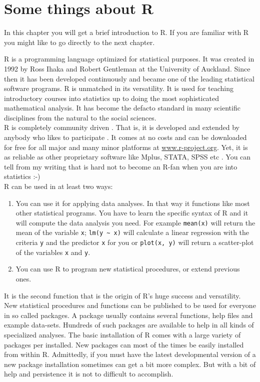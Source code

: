 \documentclass[
  letterpaper,
  DIV=11,
  numbers=noendperiod]{scrreprt}
\providecommand{\tightlist}{%
  \setlength{\itemsep}{0pt}\setlength{\parskip}{0pt}}\usepackage{longtable,booktabs,array}
\begin{document}
\hypertarget{some-things-about-r}{%
\chapter{Some things about R}\label{some-things-about-r}}

In this chapter you will get a brief introduction to R. If you are
familiar with R you might like to go directly to the next chapter.

\hfill\break
R is a programming language optimized for statistical purposes. It was
created in 1992 by Ross Ihaka and Robert Gentleman at the University of
Auckland. Since then it has been developed continuously and became one
of the leading statistical software programs. R is unmatched in its
versatility. It is used for teaching introductory courses into
statistics up to doing the most sophisticated mathematical analysis. It
has become the defacto standard in many scientific disciplines from the
natural to the social sciences.\\
R is completely community driven . That is, it is developed and extended
by anybody who likes to participate . It comes at no costs and can be
downloaded for free for all major and many minor platforms at
\href{http://www.r-project.org}{www.r-project.org}. Yet, it is as
reliable as other proprietary software like Mplus, STATA, SPSS etc . You
can tell from my writing that is hard not to become an R-fan when you
are into statistics :-)\\
R can be used in at least two ways:

\begin{enumerate}
\def\labelenumi{\arabic{enumi}.}
\tightlist
\item
  You can use it for applying data analyses. In that way it functions
  like most other statistical programs. You have to learn the specific
  syntax of R and it will compute the data analysis you need. For
  example \texttt{mean(x)} will return the mean of the variable
  \texttt{x}; \texttt{lm(y\ \textasciitilde{}\ x)} will calculate a
  linear regression with the criteria \texttt{y} and the predictor
  \texttt{x} for you or \texttt{plot(x,\ y)} will return a scatter-plot
  of the variables \texttt{x} and \texttt{y}.
\item
  You can use R to program new statistical procedures, or extend
  previous ones.
\end{enumerate}

It is the second function that is the origin of R's huge success and
versatility. New statistical procedures and functions can be published
to be used for everyone in so called packages. A package usually
contains several functions, help files and example data-sets. Hundreds
of such packages are available to help in all kinds of specialized
analyses. The basic installation of R comes with a large variety of
packages per installed. New packages can most of the times be easily
installed from within R. Admittedly, if you must have the latest
developmental version of a new package installation sometimes can get a
bit more complex. But with a bit of help and persistence it is not to
difficult to accomplish.
\end{document}
